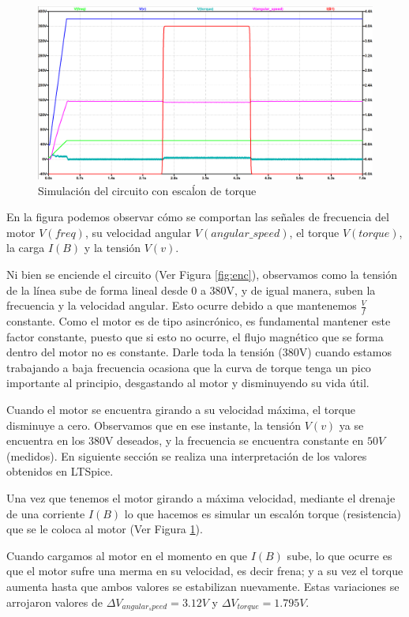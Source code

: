 \documentclass[e4_tp3_main.tex]{subfiles}
\begin{document}
\begin{figure}[H]
	\centering
	\includegraphics[width=0.6\linewidth]{Imagenes/3-1-a-general.png}
	\caption{Simulación del circuito con esca\'lon de torque}
	\label{fig:torq}
\end{figure}

En la figura podemos observar cómo se comportan las señales de frecuencia del motor $V(freq)$, su velocidad angular $V(angular\_speed)$, el torque $V(torque)$, la carga $I(B)$ y la tensión $V(v)$.
\vspace{0.5cm}

Ni bien se enciende el circuito (Ver Figura \ref{fig:enc}), observamos como la tensión de la línea sube de forma lineal desde 0 a 380V, y de igual manera, suben la frecuencia y la velocidad angular. Esto ocurre debido a que mantenemos $\frac{V}{f}$ constante. Como el motor es de tipo asincrónico, es fundamental mantener este factor constante, puesto que si esto no ocurre, el flujo magnético que se forma dentro del motor no es constante. Darle toda la tensi\'on (380V) cuando estamos trabajando a baja frecuencia ocasiona que la curva de torque tenga un pico importante al principio, desgastando al motor y disminuyendo su vida útil.
\vspace{0.5cm}

Cuando el motor se encuentra girando a su velocidad m\'axima, el torque disminuye a cero. Observamos que en ese instante, la tensión $V(v)$ ya se encuentra en los 380V deseados, y la frecuencia se encuentra constante en $50V$ (medidos). En siguiente secci\'on se realiza una interpretaci\'on de los valores obtenidos en LTSpice. 
\vspace{0.5cm}

Una vez que tenemos el motor girando a máxima velocidad, mediante el drenaje de una corriente $I(B)$ lo que hacemos es simular un escal\'on torque (resistencia) que se le coloca al motor (Ver Figura \ref{fig:torq}). 
\vspace{0.5cm}

Cuando cargamos al motor en el momento en que $I(B)$ sube, lo que ocurre es que el motor sufre una merma en su velocidad, es decir frena; y a su vez el torque aumenta hasta que ambos valores se estabilizan nuevamente. Estas variaciones se arrojaron valores de $\Delta V_{angular_speed}=3.12 V$ y $\Delta V_{torque}=1.795 V$.
\vspace{0.5cm}
\end{document}
